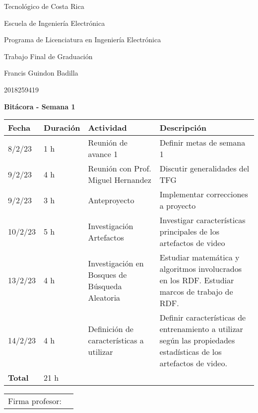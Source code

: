 \documentclass[12pt,oneside]{book}
\begin{document}
 \graphicspath{{./}{../tesis/fig/}}
  Tecnológico de Costa Rica
  \par\vspace{1mm}
  Escuela de Ingeniería Electrónica
  \par\vspace{1mm}
  Programa de Licenciatura en Ingeniería Electrónica
  \par\vspace{10mm}
  Trabajo Final de Graduación
  \par\vspace{1mm}
  Francis Guindon Badilla
  \par\vspace{1mm}
  2018259419
  \par\vspace{10mm}
  \textbf{Bitácora - Semana 1}
  \par\vspace{10mm}

  \begin{table} [!h]
    \centering
    \begin{tabular}{p{1.5 cm} p{1.7 cm} p{5 cm} p{8 cm}}
      \hline
      Fecha & Duración & Actividad & Descripción \\
      \hline
      8/2/23 & 1 h & Reunión de avance 1 & Definir metas de semana 1 \\
      9/2/23 & 4 h & Reunión con Prof. Miguel Hernandez & Discutir generalidades del TFG \\
      9/2/23 & 3 h & Anteproyecto & Implementar correcciones a proyecto \\
      10/2/23 & 5 h & Investigación Artefactos & Investigar características principales de los artefactos de video \cite{Greengrass2009,Glavota2016} \\
      13/2/23 & 4 h & Investigación en Bosques de Búsqueda Aleatoria & Estudiar matemática y algoritmos involucrados en los RDF. Estudiar marcos de trabajo de RDF. \\
      14/2/23 & 4 h & Definición de características a utilizar & Definir características de entrenamiento a utilizar según las propiedades estadísticas de los artefactos de video. \\
      \hline
      \textbf{Total} & 21 h \\
      \hline
    \end{tabular}
  \end{table}
  
  \vfill

  \begin{tabular}{p{3 cm} p{10 cm}}
    Firma profesor: & \\
    \cline{2-2}
  \end{tabular}

  \printbibliography[title={Bibliografía},heading=bibintoc]
\end{document}

